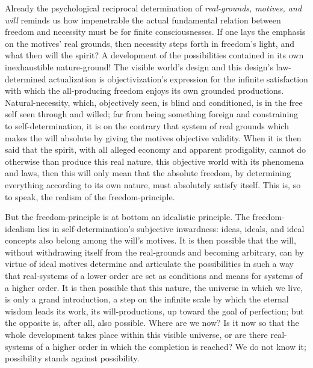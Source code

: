 \documentclass[12pt]{article}
\begin{document}
Already the psychological reciprocal determination of \emph{real-grounds,
motives, and will} reminds us how impenetrable the actual fundamental relation
between freedom and necessity must be for finite consciousnesses. If one lays
the emphasis on the motives' real grounds, then necessity steps forth in
freedom's light, and what then will the spirit? A development of the
possibilities contained in its own inexhaustible nature-ground! The visible
world's design and this design's law-determined actualization is
objectivization's expression for the infinite satisfaction with which the
all-producing freedom enjoys its own grounded productions. Natural-necessity,
which, objectively seen, is blind and conditioned, is in the free self seen
through and willed; far from being something foreign and constraining to
self-determination, it is on the contrary that system of real grounds which
makes the will absolute by giving the motives objective validity. When it is
then said that the spirit, with all alleged economy and apparent prodigality,
cannot do otherwise than produce this real nature, this objective world with
its phenomena and laws, then this will only mean that the absolute freedom, by
determining everything according to its own nature, must absolutely satisfy
itself. This is, so to speak, the realism of the freedom-principle.

But the freedom-principle is at bottom an idealistic principle. The
freedom-idealism lies in self-determination's subjective inwardness: ideas,
ideals, and ideal concepts also belong among the will's motives. It is then
possible that the will, without withdrawing itself from the real-grounds and
becoming arbitrary, can by virtue of ideal motives determine and articulate
the possibilities in such a way that
real-systems of a lower order are set as conditions and means for systems of a
higher order. It is then possible that this nature, the universe in which we
live, is only a grand introduction, a step on the infinite scale by which the
eternal wisdom leads its work, its will-productions, up toward the goal of
perfection; but the opposite is, after all, also possible. Where are we now?
Is it now so that the whole development takes place within this visible
universe, or are there real-systems of a higher order in which the completion
is reached? We do not know it; possibility stands against possibility.
\end{document}
